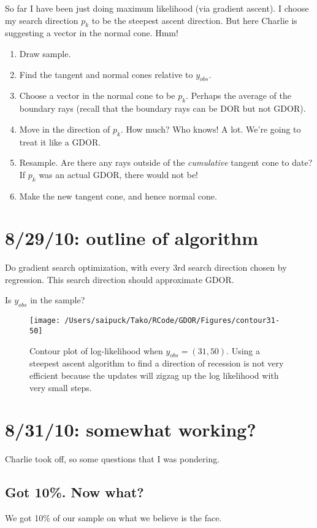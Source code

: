 \documentclass{amsbook}
\theoremstyle{definition}
\theoremstyle{remark}
\begin{document}
So far I have been just doing maximum likelihood (via gradient ascent).  I choose my search direction $p_k$ to be the steepest ascent direction.  But here Charlie is suggesting a vector in the normal cone.  Hmm!  
\begin{enumerate}
\item Draw sample.
\item Find the tangent and normal cones relative to $y_{obs}$.  
\item Choose a vector in the normal cone to be $p_k$.  Perhaps the average of the boundary rays (recall that the boundary rays can be DOR but not GDOR).
\item Move in the direction of $p_k$.  How much?  Who knows!  A lot.  We're going to treat it like a GDOR.
\item Resample.  Are there any rays outside of the \emph{cumulative} tangent cone to date?  If $p_k$ was an actual GDOR, there would not be!  
\item Make the new tangent cone, and hence normal cone.  
\end{enumerate}

\section{8/29/10: outline of algorithm}
Do gradient search optimization, with every 3rd search direction chosen by regression.  This search direction should approximate GDOR.

Is $y_{obs}$ in the sample?



\begin{figure}[!h]
\centering
\texttt{[image: /Users/saipuck/Tako/RCode/GDOR/Figures/contour31-50]}
\caption{Contour plot of log-likelihood when $y_{obs} = (31, 50)$.  Using a steepest ascent algorithm to find a direction of recession is not very efficient because the updates will zigzag up the log likelihood with very small steps.}
\end{figure}

\section{8/31/10: somewhat working?}
Charlie took off, so some questions that I was pondering.
\subsection{Got 10\%.  Now what?}
We got 10\% of our sample on what we believe is the face.  
\end{document}

